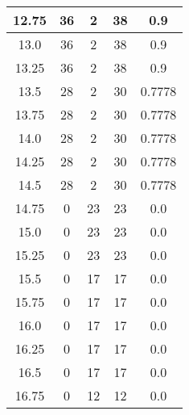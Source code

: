 \documentclass[letterpaper, 12pt]{article}
\begin{document}
\begin{longtable}{|c|c|c|c|c|}
\hline
12.75 & 36 & 2 & 38 & 0.9 \\
\hline
13.0 & 36 & 2 & 38 & 0.9 \\
\hline
13.25 & 36 & 2 & 38 & 0.9 \\
\hline
13.5 & 28 & 2 & 30 & 0.7778 \\
\hline
13.75 & 28 & 2 & 30 & 0.7778 \\
\hline
14.0 & 28 & 2 & 30 & 0.7778 \\
\hline
14.25 & 28 & 2 & 30 & 0.7778 \\
\hline
14.5 & 28 & 2 & 30 & 0.7778 \\
\hline
14.75 & 0 & 23 & 23 & 0.0 \\
\hline
15.0 & 0 & 23 & 23 & 0.0 \\
\hline
15.25 & 0 & 23 & 23 & 0.0 \\
\hline
15.5 & 0 & 17 & 17 & 0.0 \\
\hline
15.75 & 0 & 17 & 17 & 0.0 \\
\hline
16.0 & 0 & 17 & 17 & 0.0 \\
\hline
16.25 & 0 & 17 & 17 & 0.0 \\
\hline
16.5 & 0 & 17 & 17 & 0.0 \\
\hline
16.75 & 0 & 12 & 12 & 0.0 \\
\hline
\end{longtable}
\end{document}
